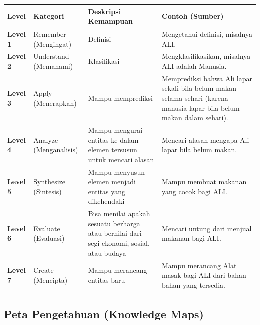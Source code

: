\documentclass[
  letterpaper,
  DIV=11,
  numbers=noendperiod]{scrreprt}
\begin{document}
\begin{longtable}[]{@{}
  >{\centering\arraybackslash}p{}
  >{\centering\arraybackslash}p{}
  >{\raggedright\arraybackslash}p{}
  >{\raggedright\arraybackslash}p{}@{}}
\toprule\noalign{}
\begin{minipage}[b]{\linewidth}\centering
Level
\end{minipage} & \begin{minipage}[b]{\linewidth}\centering
Kategori
\end{minipage} & \begin{minipage}[b]{\linewidth}\raggedright
Deskripsi Kemampuan
\end{minipage} & \begin{minipage}[b]{\linewidth}\raggedright
Contoh (Sumber)
\end{minipage} \\
\midrule\noalign{}
\endhead
\bottomrule\noalign{}
\endlastfoot
\textbf{Level 1} & Remember (Mengingat) & Definisi & Mengetahui
definisi, misalnya ALI. \\
\textbf{Level 2} & Understand (Memahami) & Klasifikasi &
Mengklasifikasikan, misalnya ALI adalah Manusia. \\
\textbf{Level 3} & Apply (Menerapkan) & Mampu memprediksi & Memprediksi
bahwa Ali lapar sekali bila belum makan selama sehari (karena manusia
lapar bila belum makan dalam sehari). \\
\textbf{Level 4} & Analyze (Menganalisis) & Mampu mengurai entitas ke
dalam elemen tersusun untuk mencari alasan & Mencari alasan mengapa Ali
lapar bila belum makan. \\
\textbf{Level 5} & Synthesize (Sintesis) & Mampu menyusun elemen menjadi
entitas yang dikehendaki & Mampu membuat makanan yang cocok bagi ALI. \\
\textbf{Level 6} & Evaluate (Evaluasi) & Bisa menilai apakah sesuatu
berharga atau bernilai dari segi ekonomi, sosial, atau budaya & Mencari
untung dari menjual makanan bagi ALI. \\
\textbf{Level 7} & Create (Mencipta) & Mampu merancang entitas baru &
Mampu merancang Alat masak bagi ALI dari bahan-bahan yang tersedia. \\
\end{longtable}

\subsection{Peta Pengetahuan (Knowledge
Maps)}\label{peta-pengetahuan-knowledge-maps}
\end{document}
